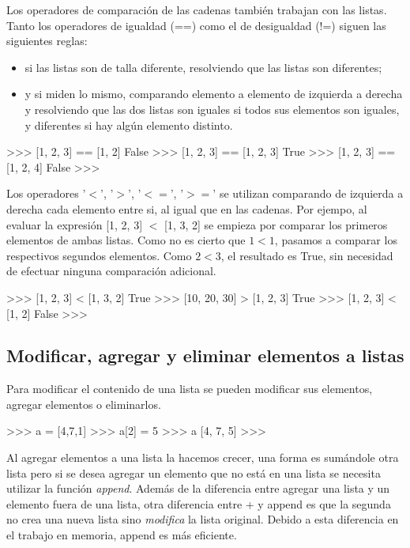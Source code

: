 Los operadores de comparación de las cadenas también trabajan con las listas.  Tanto los operadores de igualdad (==) como el de desigualdad (!=) siguen las siguientes reglas:

\begin{itemize}
\item si las listas son de talla diferente, resolviendo que las listas son diferentes;
\item y si miden lo mismo, comparando elemento a elemento de izquierda a derecha y resolviendo que las dos listas son iguales si todos sus elementos son iguales, y diferentes si hay algún elemento distinto.
\end{itemize}

\begin{pyglist} [language=python]
>>> [1, 2, 3] == [1, 2]
False
>>> [1, 2, 3] == [1, 2, 3]
True
>>> [1, 2, 3] == [1, 2, 4]
False
>>> 
\end{pyglist}

Los operadores '$<$', '$>$', '$<=$', '$>=$' se utilizan comparando de izquierda a derecha cada elemento entre si, al igual que en las cadenas. Por ejempo, al evaluar la expresión [1, 2, 3] $<$ [1, 3, 2] se empieza por comparar los primeros elementos de ambas listas. Como no es cierto que $1 < 1$, pasamos a comparar los respectivos segundos elementos. Como $2 < 3$, el resultado es True, sin necesidad de efectuar ninguna comparación adicional.\\

\begin{pyglist} [language=python]
>>> [1, 2, 3] < [1, 3, 2]
True
>>> [10, 20, 30] > [1, 2, 3]
True
>>> [1, 2, 3] < [1, 2]
False
>>> 
\end{pyglist}

\subsection{Modificar, agregar y eliminar elementos a listas}

Para modificar el contenido de una lista se pueden modificar sus elementos, agregar elementos o eliminarlos. \\

\begin{pyglist} [language=python]
>>> a = [4,7,1]
>>> a[2] = 5
>>> a
[4, 7, 5]
>>> 
\end{pyglist}

Al agregar elementos a una lista la hacemos crecer, una forma es sumándole otra lista pero si se desea agregar un elemento que no está en una lista se necesita utilizar la función \textit{append}. Además de la diferencia entre agregar una lista y un elemento fuera de una lista, otra diferencia entre + y append es que la segunda no crea una nueva lista sino \textit{modifica} la lista original. Debido a esta diferencia en el trabajo en memoria, append es más eficiente.\\

